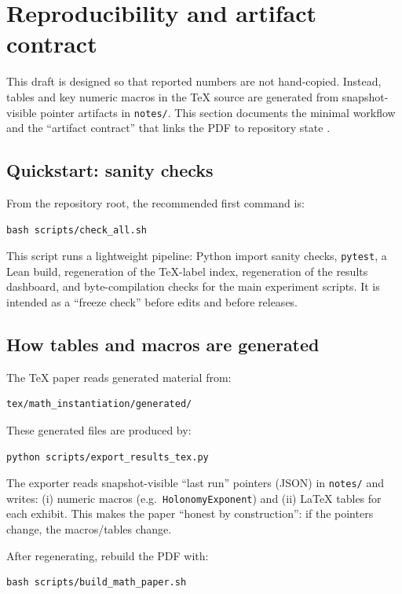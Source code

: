\section{Reproducibility and artifact contract}
\label{sec:reproducibility}

This draft is designed so that reported numbers are not hand-copied.
Instead, tables and key numeric macros in the TeX source are generated from snapshot-visible pointer artifacts in \texttt{notes/}.
This section documents the minimal workflow and the ``artifact contract'' that links the PDF to repository state \cite{clt_repo}.

\subsection{Quickstart: sanity checks}
From the repository root, the recommended first command is:
\begin{verbatim}
bash scripts/check_all.sh
\end{verbatim}
This script runs a lightweight pipeline:
Python import sanity checks, \texttt{pytest}, a Lean build, regeneration of the TeX-label index, regeneration of the results dashboard, and byte-compilation checks for the main experiment scripts.
It is intended as a ``freeze check'' before edits and before releases.

\subsection{How tables and macros are generated}
The TeX paper reads generated material from:
\begin{verbatim}
tex/math_instantiation/generated/
\end{verbatim}
These generated files are produced by:
\begin{verbatim}
python scripts/export_results_tex.py
\end{verbatim}
The exporter reads snapshot-visible ``last run'' pointers (JSON) in \texttt{notes/} and writes:
(i) numeric macros (e.g.\ \texttt{HolonomyExponent}) and
(ii) LaTeX tables for each exhibit.
This makes the paper ``honest by construction'': if the pointers change, the macros/tables change.

After regenerating, rebuild the PDF with:
\begin{verbatim}
bash scripts/build_math_paper.sh
\end{verbatim}

